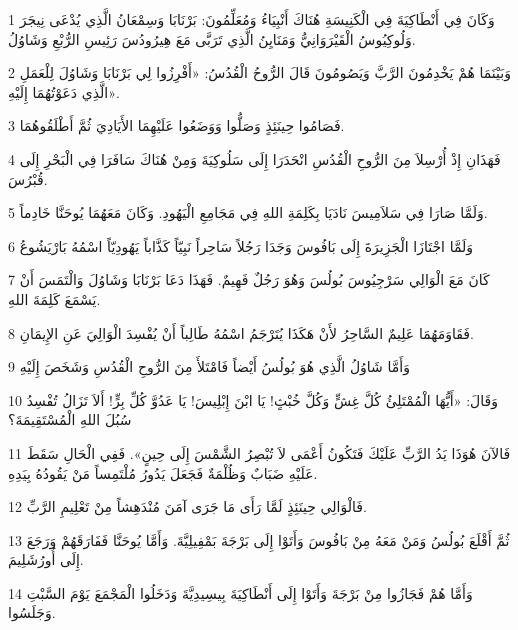 \par 1 وَكَانَ فِي أَنْطَاكِيَةَ فِي الْكَنِيسَةِ هُنَاكَ أَنْبِيَاءُ وَمُعَلِّمُونَ: بَرْنَابَا وَسِمْعَانُ الَّذِي يُدْعَى نِيجَرَ وَلُوكِيُوسُ الْقَيْرَوَانِيُّ وَمَنَايِنُ الَّذِي تَرَبَّى مَعَ هِيرُودُسَ رَئِيسِ الرُّبْعِ وَشَاوُلُ.
\par 2 وَبَيْنَمَا هُمْ يَخْدِمُونَ الرَّبَّ وَيَصُومُونَ قَالَ الرُّوحُ الْقُدُسُ: «أَفْرِزُوا لِي بَرْنَابَا وَشَاوُلَ لِلْعَمَلِ الَّذِي دَعَوْتُهُمَا إِلَيْهِ».
\par 3 فَصَامُوا حِينَئِذٍ وَصَلُّوا وَوَضَعُوا عَلَيْهِمَا الأَيَادِيَ ثُمَّ أَطْلَقُوهُمَا.
\par 4 فَهَذَانِ إِذْ أُرْسِلاَ مِنَ الرُّوحِ الْقُدُسِ انْحَدَرَا إِلَى سَلُوكِيَةَ وَمِنْ هُنَاكَ سَافَرَا فِي الْبَحْرِ إِلَى قُبْرُسَ.
\par 5 وَلَمَّا صَارَا فِي سَلاَمِيسَ نَادَيَا بِكَلِمَةِ اللهِ فِي مَجَامِعِ الْيَهُودِ. وَكَانَ مَعَهُمَا يُوحَنَّا خَادِماً.
\par 6 وَلَمَّا اجْتَازَا الْجَزِيرَةَ إِلَى بَافُوسَ وَجَدَا رَجُلاً سَاحِراً نَبِيّاً كَذَّاباً يَهُودِيّاً اسْمُهُ بَارْيَشُوعُ
\par 7 كَانَ مَعَ الْوَالِي سَرْجِيُوسَ بُولُسَ وَهُوَ رَجُلٌ فَهِيمٌ. فَهَذَا دَعَا بَرْنَابَا وَشَاوُلَ وَالْتَمَسَ أَنْ يَسْمَعَ كَلِمَةَ اللهِ.
\par 8 فَقَاوَمَهُمَا عَلِيمٌ السَّاحِرُ لأَنْ هَكَذَا يُتَرْجَمُ اسْمُهُ طَالِباً أَنْ يُفْسِدَ الْوَالِيَ عَنِ الإِيمَانِ.
\par 9 وَأَمَّا شَاوُلُ الَّذِي هُوَ بُولُسُ أَيْضاً فَامْتَلأَ مِنَ الرُّوحِ الْقُدُسِ وَشَخَصَ إِلَيْهِ
\par 10 وَقَالَ: «أَيُّهَا الْمُمْتَلِئُ كُلَّ غِشٍّ وَكُلَّ خُبْثٍ! يَا ابْنَ إِبْلِيسَ! يَا عَدُوَّ كُلِّ بِرٍّ! أَلاَ تَزَالُ تُفْسِدُ سُبُلَ اللهِ الْمُسْتَقِيمَةَ؟
\par 11 فَالآنَ هُوَذَا يَدُ الرَّبِّ عَلَيْكَ فَتَكُونُ أَعْمَى لاَ تُبْصِرُ الشَّمْسَ إِلَى حِينٍ». فَفِي الْحَالِ سَقَطَ عَلَيْهِ ضَبَابٌ وَظُلْمَةٌ فَجَعَلَ يَدُورُ مُلْتَمِساً مَنْ يَقُودُهُ بِيَدِهِ.
\par 12 فَالْوَالِي حِينَئِذٍ لَمَّا رَأَى مَا جَرَى آمَنَ مُنْدَهِشاً مِنْ تَعْلِيمِ الرَّبِّ.
\par 13 ثُمَّ أَقْلَعَ بُولُسُ وَمَنْ مَعَهُ مِنْ بَافُوسَ وَأَتَوْا إِلَى بَرْجَةَ بَمْفِيلِيَّةَ. وَأَمَّا يُوحَنَّا فَفَارَقَهُمْ وَرَجَعَ إِلَى أُورُشَلِيمَ.
\par 14 وَأَمَّا هُمْ فَجَازُوا مِنْ بَرْجَةَ وَأَتَوْا إِلَى أَنْطَاكِيَةَ بِيسِيدِيَّةَ وَدَخَلُوا الْمَجْمَعَ يَوْمَ السَّبْتِ وَجَلَسُوا.
